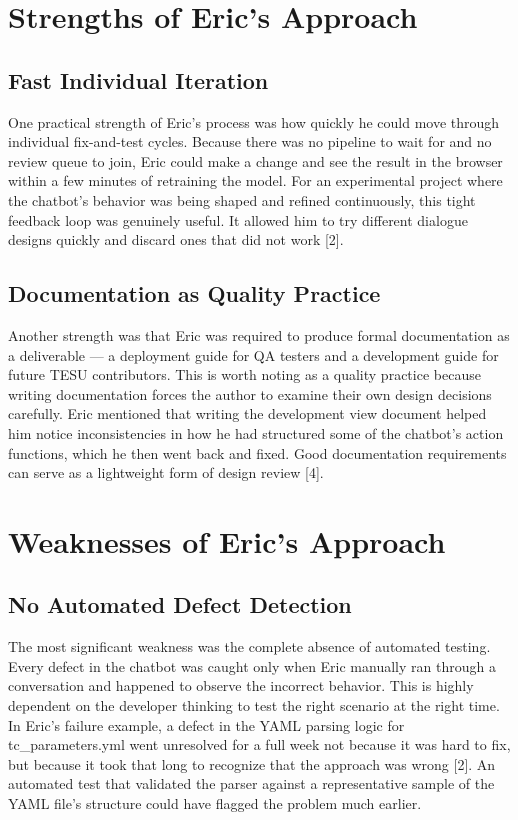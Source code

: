 \documentclass[sigconf]{acmart}
\begin{document}
\section{Strengths of Eric's Approach}

\subsection{Fast Individual Iteration}

One practical strength of Eric's process was how quickly he could move through individual fix-and-test cycles. Because there was no pipeline to wait for and no review queue to join, Eric could make a change and see the result in the browser within a few minutes of retraining the model. For an experimental project where the chatbot's behavior was being shaped and refined continuously, this tight feedback loop was genuinely useful. It allowed him to try different dialogue designs quickly and discard ones that did not work [2].

\subsection{Documentation as Quality Practice}

Another strength was that Eric was required to produce formal documentation as a deliverable — a deployment guide for QA testers and a development guide for future TESU contributors. This is worth noting as a quality practice because writing documentation forces the author to examine their own design decisions carefully. Eric mentioned that writing the development view document helped him notice inconsistencies in how he had structured some of the chatbot's action functions, which he then went back and fixed. Good documentation requirements can serve as a lightweight form of design review [4].

\section{Weaknesses of Eric's Approach}

\subsection{No Automated Defect Detection}

The most significant weakness was the complete absence of automated testing. Every defect in the chatbot was caught only when Eric manually ran through a conversation and happened to observe the incorrect behavior. This is highly dependent on the developer thinking to test the right scenario at the right time. In Eric's failure example, a defect in the YAML parsing logic for tc\_parameters.yml went unresolved for a full week not because it was hard to fix, but because it took that long to recognize that the approach was wrong [2]. An automated test that validated the parser against a representative sample of the YAML file's structure could have flagged the problem much earlier.
\end{document}
